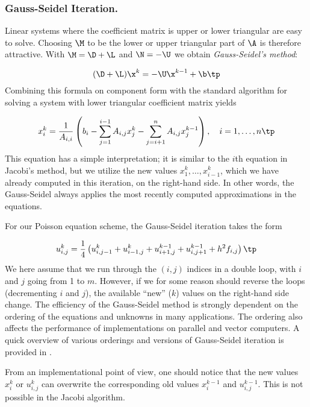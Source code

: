 \subsubsection{Gauss-Seidel Iteration.}
Linear systems where the coefficient matrix is
upper or lower triangular are easy to solve. Choosing $\M$ to be the
lower or upper triangular part of $\A$ is therefore attractive.
With $\M = \D + \L$ and $\N =-\U$ we obtain \emph{Gauss-Seidel's method}:

\begin{equation} (\D + \L )\x^{k} = -\U\x^{k-1} + \b \tp
\end{equation}
Combining this formula on component form with the standard algorithm for
solving a system with lower triangular coefficient matrix yields

\begin{equation}
x_i^{k} = {1\over A_{i,i}}\left( b_i -\sum_{j=1}^{i-1}A_{i,j}x_j^{k}
- \sum_{j=i+1}^n A_{i,j}x_j^{k-1} \right),\quad
i=1,\ldots,n \tp
\label{linalg2:classic:GS1}
\end{equation}
This equation has a simple interpretation; it is similar to the $i$th
equation in Jacobi's method, but we utilize the new values
$x_1^k,\ldots,x_{i-1}^k$, which we have already computed in this iteration,
on the right-hand side. In other words, the Gauss-Seidel always applies
the most recently computed approximations in the equations.

For our Poisson equation scheme, the Gauss-Seidel iteration takes the form

\begin{equation}
u^{k}_{i,j} = {1\over4}\left(
u^{k}_{i,j-1} + u^{k}_{i-1,j} + u^{k-1}_{i+1,j} + u^{k-1}_{i,j+1}
+ h^2f_{i,j}\right)
\tp
\label{linalg2:classic:GS2}
\end{equation}
We here assume that we run through the $(i,j)$ indices in a double loop,
with $i$ and $j$ going from 1 to $m$.
However, if we for some reason should
reverse the loops (decrementing $i$ and $j$), the available
 ``new'' ($k$) values on the right-hand side change.
The efficiency of the Gauss-Seidel method is strongly dependent on the
ordering of the equations and unknowns in many applications.
The ordering also affects the performance of implementations on
parallel and vector computers.
A quick overview of various orderings and versions of Gauss-Seidel iteration
is provided in \cite[Ch.~4.3]{Wesseling92}.

From an implementational point of view, one should notice that
the new values $x_i^{k}$ or $u_{i,j}^{k}$ can overwrite the
corresponding old values $x_i^{k-1}$ and $u_{i,j}^{k-1}$.
This is not possible in the Jacobi algorithm.

